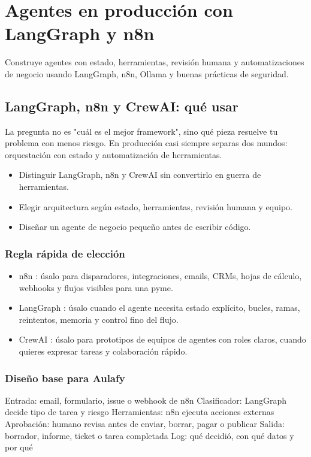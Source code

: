 \documentclass[11pt,a4paper]{book}
\begin{document}
\part{Agentes en producción con LangGraph y n8n}
Construye agentes con estado, herramientas, revisión humana y automatizaciones de negocio usando LangGraph, n8n, Ollama y buenas prácticas de seguridad.

\chapter{LangGraph, n8n y CrewAI: qué usar}
La pregunta no es "cuál es el mejor framework", sino qué pieza resuelve tu problema con menos riesgo. En producción casi siempre separas dos mundos: orquestación con estado y automatización de herramientas.

\begin{itemize}\item Distinguir LangGraph, n8n y CrewAI sin convertirlo en guerra de herramientas.\end{itemize}
\begin{itemize}\item Elegir arquitectura según estado, herramientas, revisión humana y equipo.\end{itemize}
\begin{itemize}\item Diseñar un agente de negocio pequeño antes de escribir código.\end{itemize}
\section{Regla rápida de elección}
\begin{itemize}\item n8n : úsalo para disparadores, integraciones, emails, CRMs, hojas de cálculo, webhooks y flujos visibles para una pyme.\end{itemize}
\begin{itemize}\item LangGraph : úsalo cuando el agente necesita estado explícito, bucles, ramas, reintentos, memoria y control fino del flujo.\end{itemize}
\begin{itemize}\item CrewAI : úsalo para prototipos de equipos de agentes con roles claros, cuando quieres expresar tareas y colaboración rápido.\end{itemize}
\section{Diseño base para Aulafy}
\begin{codebox}
Entrada: email, formulario, issue o webhook de n8n
Clasificador: LangGraph decide tipo de tarea y riesgo
Herramientas: n8n ejecuta acciones externas
Aprobación: humano revisa antes de enviar, borrar, pagar o publicar
Salida: borrador, informe, ticket o tarea completada
Log: qué decidió, con qué datos y por qué
\end{codebox}
\end{document}

